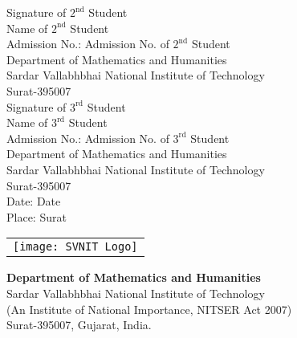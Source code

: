 \documentclass[11pt,a4paper]{report}
\begin{document}
{\color{red} Signature of $2^{\text{nd}}$ Student} \\
{\color{red} Name of $2^{\text{nd}}$ Student} \\
Admission No.: {\color{red} Admission No. of $2^{\text{nd}}$ Student} \\
Department of Mathematics and Humanities \\
Sardar Vallabhbhai National Institute of Technology \\
Surat-395007 \\[1\baselineskip]

{\color{red} Signature of $3^{\text{rd}}$ Student} \\
{\color{red} Name of $3^{\text{rd}}$ Student} \\
Admission No.: {\color{red} Admission No. of $3^{\text{rd}}$ Student} \\
Department of Mathematics and Humanities \\
Sardar Vallabhbhai National Institute of Technology \\
Surat-395007 \\[1\baselineskip]

Date: {\color{red} Date} \\
Place: Surat


\newpage

\begin{minipage}{0.3\linewidth}
\begin{tabular}{r}
\texttt{[image: SVNIT Logo]}
\end{tabular}
\end{minipage}
\begin{minipage}{0.7\linewidth}
\begin{center}
\begin{large}
\textbf{Department of Mathematics and Humanities} \\
Sardar Vallabhbhai National Institute of Technology \\
(An Institute of National Importance, NITSER Act 2007) \\
Surat-395007, Gujarat, India.
\end{large}
\end{center}
\end{minipage}

\begin{center}
\hrulefill \\
\vspace*{-0.5cm}

\hrulefill
\end{center}
\end{document}
